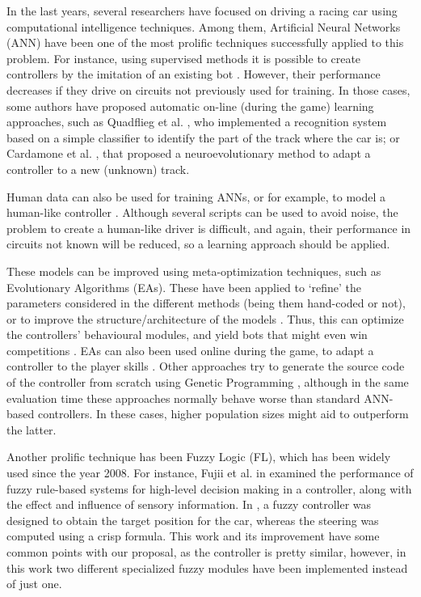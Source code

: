 \documentclass[runningheads,a4paper]{llncs}
\begin{document}
	In the last years, several researchers have focused on driving a racing car using computational intelligence techniques. 
	Among them, Artificial Neural Networks (ANN) have been one of the most prolific techniques successfully applied to this problem. For instance, using supervised methods it is possible to create controllers by the imitation of an existing bot \cite{CardamoneImitation09}. However, their performance decreases if they drive on circuits not previously used for training. In those cases, some authors have proposed automatic on-line (during the game) learning approaches, such as Quadflieg et al. \cite{Quadflieg_LearningTrack}, who implemented a recognition system based on a simple classifier to identify the part of the track where the car is; or Cardamone et al. \cite{Cardamone_Online_NN}, that proposed a neuroevolutionary method to adapt a controller to a new (unknown) track.
	
	Human data can also be used for training ANNs, or for example, to model a human-like controller \cite{MunozHumanLike10}. Although several scripts can be used to avoid noise, the problem to create a human-like driver is difficult, and again, their performance in circuits not known will be reduced, so a learning approach should be applied.
	
	These models can be improved using meta-optimization techniques, such as Evolutionary Algorithms (EAs). These have been applied to `refine' the parameters \cite{ButzCMAES09} considered in the different methods (being them hand-coded or not), or to improve the structure/architecture of the models \cite{evol}. Thus, this can optimize the controllers' behavioural modules, and yield bots that might even win competitions \cite{ButzCMAES09,torcs2012}. EAs can also been used online during the game, to adapt a controller to the player skills \cite{TanOnline08,Cardamone_Online_NN}. Other approaches try to generate the source code of the controller from scratch using Genetic Programming \cite{AgapitosGP07}, although in the same evaluation time these approaches normally behave worse than standard ANN-based controllers. In these cases, higher population sizes might aid to outperform the latter.
	
	Another prolific technique has been Fuzzy Logic (FL), which has been widely used since the year 2008. For instance, Fujii et al. in \cite{Fujii2008} examined the performance of fuzzy rule-based systems for high-level decision making in a controller, along with the effect and influence of sensory information.
	In \cite{CarRacing_Pelta09}, a fuzzy controller was designed to obtain the target position for the car, whereas the steering was computed using a crisp formula. This work and its improvement \cite{torcs2012} have some common points with our proposal, as the controller is pretty similar, however, in this work two different specialized fuzzy modules have been implemented instead of just one.
	
\end{document}
